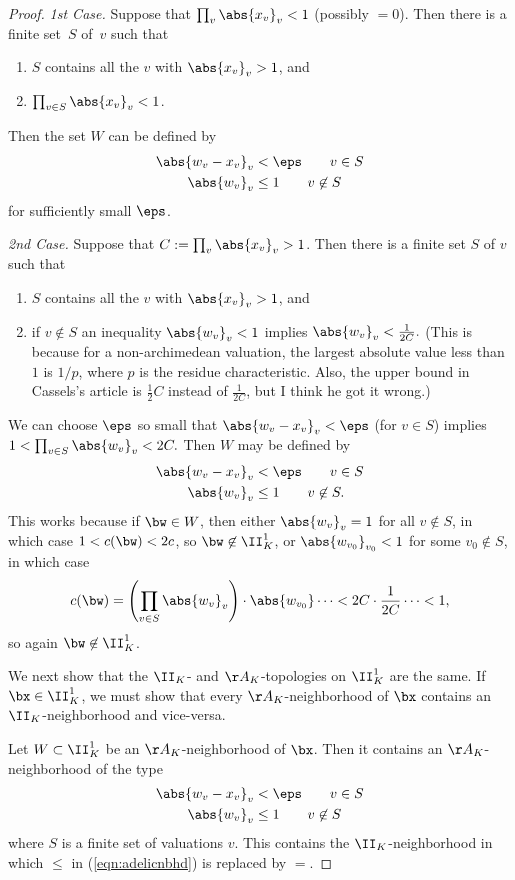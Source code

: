 \documentclass[11pt]{book}
\begin{document}
\begin{ch}
\begin{proof}
{\em 1st Case.}  Suppose that $\prod_v \abs{x_v}_v<1$ (possibly $=0$).
Then there is a finite set~$S$ of~$v$ such that
\begin{enumerate}
\item $S$ contains all the $v$ with $\abs{x_v}_v>1$, and
\item $\prod_{v\in S}\abs{x_v}_v < 1$.
\end{enumerate}
Then the set $W$ can be
defined by
\begin{align*}
  \abs{w_v - x_v}_v &< \eps \qquad v\in S\\
  \abs{w_v}_v &\leq 1 \qquad v\not\in S
\end{align*}
for sufficiently small $\eps$.

{\em 2nd Case.} Suppose that $C:=\prod_v \abs{x_v}_v>1$.
Then there is a finite set $S$ of $v$ such that
\begin{enumerate}
\item $S$ contains all the $v$ with $\abs{x_v}_v>1$, and
\item if $v\not\in S$ an inequality
$\abs{w_v}_v<1$ implies $\abs{w_v}_v < \frac{1}{2C}.$
(This is because for a non-archimedean valuation, the
largest absolute value less than $1$ is $1/p$, where $p$ is
the residue characteristic.  Also, the upper bound in
Cassels's article is $\frac{1}{2}C$ instead of $\frac{1}{2C}$,
but I think he got it wrong.)
\end{enumerate}
We can choose $\eps$ so small that
$\abs{w_v-x_v}_v<\eps$ (for $v\in S$) implies
$1<\prod_{v\in S} \abs{w_v}_v < 2C.$  Then $W$ may be defined
by
\begin{align*}
  \abs{w_v - x_v}_v &< \eps \qquad v\in S\\
  \abs{w_v}_v &\leq 1 \qquad v\not\in S.
\end{align*}
This works because if $\bw\in W$, then either
$\abs{w_v}_v=1$ for all $v\not\in S$, in
which case $1 < c(\bw)  < 2c$, so $\bw\not\in \II_K^1$,
or $\abs{w_{v_0}}_{v_0}<1$ for some $v_0\not\in S$, in
which case $$c(\bw) = \left(\prod_{v\in S} \abs{w_v}_v \right)\cdot
\abs{w_{v_0}} \cdots < 2C \cdot \frac{1}{2C} \cdots < 1,$$
so again $\bw\not\in\II_K^1$.

We next show that the $\II_K$- and $\AA_K$-topologies on $\II_K^1$
are the same.  If $\bx\in \II_K^1$, we must show that every
$\AA_K$-neighborhood of $\bx$ contains an $\II_K$-neighborhood
and vice-versa.

Let $W\subset \II_K^1$ be an $\AA_K$-neighborhood of $\bx$.  Then it
contains an $\AA_K$-neighborhood of the type
\begin{align}\label{eqn:adelicnbhd}
  \abs{w_v - x_v}_v &< \eps \qquad v\in S\\
  \abs{w_v}_v &\leq 1 \qquad v\not\in S
\end{align}
where $S$ is a finite set of valuations $v$.  This contains
the $\II_K$-neighborhood in which $\leq$ in (\ref{eqn:adelicnbhd})
is replaced by $=$.


\end{proof}
\end{ch}
\end{document}
